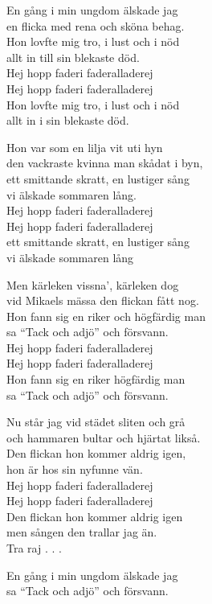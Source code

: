 \vspace{10pt}
En gång i min ungdom älskade jag\\
en flicka med rena och sköna behag.\\
Hon lovfte mig tro, i lust och i nöd\\
allt in till sin blekaste död.\\
Hej hopp faderi faderalladerej\\
Hej hopp faderi faderalladerej\\
Hon lovfte mig tro, i lust och i nöd\\
allt in i sin blekaste död.\par
\vspace{10pt}
Hon var som en lilja vit uti hyn\\
den vackraste kvinna man skådat i byn,\\
ett smittande skratt, en lustiger sång\\
vi älskade sommaren lång.\\
Hej hopp faderi faderalladerej\\
Hej hopp faderi faderalladerej\\
ett smittande skratt, en lustiger sång\\
vi älskade sommaren lång\par
\vspace{10pt}
Men kärleken vissna', kärleken dog\\
vid Mikaels mässa den flickan fått nog.\\
Hon fann sig en riker och högfärdig man\\
sa ``Tack och adjö'' och försvann.\\
Hej hopp faderi faderalladerej\\
Hej hopp faderi faderalladerej\\
Hon fann sig en riker högfärdig man\\
sa ``Tack och adjö'' och försvann.\par
\vspace{10pt}
Nu står jag vid städet sliten och grå\\
och hammaren bultar och hjärtat likså.\\
Den flickan hon kommer aldrig igen,\\
hon är hos sin nyfunne vän.\\
Hej hopp faderi faderalladerej\\
Hej hopp faderi faderalladerej\\
Den flickan hon kommer aldrig igen\\
men sången den trallar jag än.\\
Tra raj . . .\par
\vspace{15pt}
\vspace{10pt}
En gång i min ungdom älskade jag\\
sa ``Tack och adjö'' och försvann.
